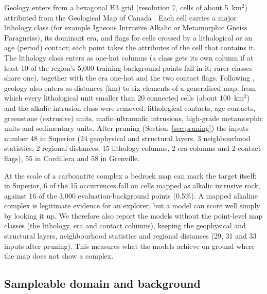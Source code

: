 \documentclass[pdflatex,sn-apa]{sn-jnl}
\begin{document}
Geology enters from a hexagonal H3 grid (resolution 7, cells of about 5~km$^2$) attributed from the Geological Map of Canada \citep{Wheeler1996}. Each cell carries a major lithology class (for example Igneous Intrusive Alkalic or Metamorphic Gneiss Paragneiss), its dominant era, and flags for cells crossed by a lithological or an age (period) contact; each point takes the attributes of the cell that contains it. The lithology class enters as one-hot columns (a class gets its own column if at least 10 of the region's 5,000 training-background points fall in it; rarer classes share one), together with the era one-hot and the two contact flags. Following \citet{Luo2026}, geology also enters as distances (km) to six elements of a generalised map, from which every lithological unit smaller than 20 connected cells (about 100~km$^2$) and the alkalic-intrusion class were removed: lithological contacts, age contacts, greenstone (extrusive) units, mafic--ultramafic intrusions, high-grade metamorphic units and sedimentary units. After pruning (Section~\ref{sec:pruning}) the inputs number 48 in Superior (24 geophysical and structural layers, 3 neighbourhood statistics, 2 regional distances, 15 lithology columns, 2 era columns and 2 contact flags), 55 in Cordillera and 58 in Grenville.

At the scale of a carbonatite complex a bedrock map can mark the target itself: in Superior, 6 of the 15 occurrences fall on cells mapped as alkalic intrusive rock, against 16 of the 3,000 evaluation-background points (0.5\%). A mapped alkaline complex is legitimate evidence for an explorer, but a model can score well simply by looking it up. We therefore also report the models without the point-level map classes (the lithology, era and contact columns), keeping the geophysical and structural layers, neighbourhood statistics and regional distances (29, 31 and 33 inputs after pruning). This measures what the models achieve on ground where the map does not show a complex.

\subsection{Sampleable domain and background}\label{sec:domain}
\end{document}

